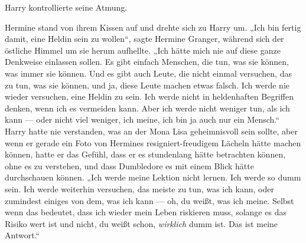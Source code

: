Harry kontrollierte seine Atmung.

Hermine stand von ihrem Kissen auf und drehte sich zu Harry um.
„Ich bin fertig damit, eine Heldin sein zu wollen“, sagte Hermine Granger, während sich der östliche Himmel um sie herum aufhellte.
„Ich hätte mich nie auf diese ganze Denkweise einlassen sollen. Es gibt einfach Menschen, die tun, was sie können, was immer sie können. Und es gibt auch Leute, die nicht einmal versuchen, das zu tun, was sie können, und ja, diese Leute machen etwas falsch. Ich werde nie wieder versuchen, eine Heldin zu sein. Ich werde nicht in heldenhaften Begriffen denken, wenn ich es vermeiden kann. Aber ich werde nicht weniger tun, als ich kann — oder nicht viel weniger, ich meine, ich bin ja auch nur ein Mensch.“
Harry hatte nie verstanden, was an der Mona Lisa geheimnisvoll sein sollte, aber wenn er gerade ein Foto von Hermines resigniert-freudigem Lächeln hätte machen können, hatte er das Gefühl, dass er es stundenlang hätte betrachten können, ohne es zu verstehen, und dass Dumbledore es mit einem Blick hätte durchschauen können.
„Ich werde meine Lektion nicht lernen. Ich werde so dumm sein. Ich werde weiterhin versuchen, das meiste zu tun, was ich kann, oder zumindest einiges von dem, was ich kann — oh, du weißt, was ich meine. Selbst wenn das bedeutet, dass ich wieder mein Leben riskieren muss, solange es das Risiko wert ist und nicht, du weißt schon, \emph{wirklich} dumm ist. Das ist meine Antwort.“

